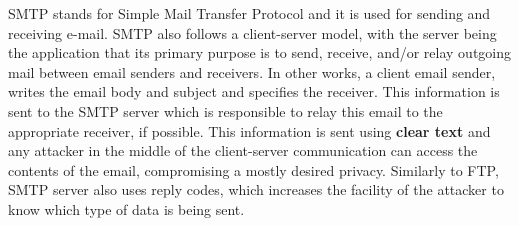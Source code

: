 SMTP stands for Simple Mail Transfer Protocol and it is used for sending and receiving e-mail. 
SMTP also follows a client-server model, with the server being the application that its primary purpose is to send, receive, and/or relay outgoing mail between email senders and receivers. 
In other works, a client email sender, writes the email body and subject and specifies the receiver. 
This information is sent to the SMTP server which is responsible to relay this email to the appropriate receiver, if possible. 
This information is sent using \textbf{clear text} and any attacker in the middle of the client-server communication can access the contents of the email, compromising a mostly desired privacy. 
Similarly to FTP, SMTP server also uses reply codes, which increases the facility of the attacker to know which type of data is being sent.

